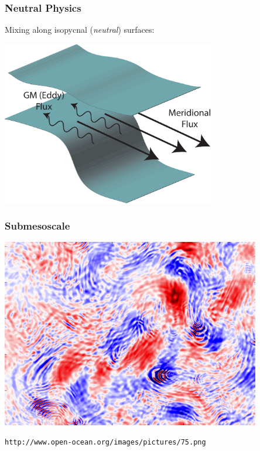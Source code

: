 \documentclass{beamer}
\begin{document}
\begin{frame}
    \frametitle{Neutral Physics}
    
    Mixing along isopycnal (\textit{neutral}) surfaces:
    \begin{center}
        \includegraphics[width=0.7\textwidth]{GMDiagram.pdf}
    \end{center}
\end{frame}

\begin{frame}
    \frametitle{Submesoscale}

    \begin{center}
        \includegraphics[width=0.85\textwidth]{submesoscale.png}
    \end{center}
    {\tiny \lstinline|http://www.open-ocean.org/images/pictures/75.png|}
\end{frame}
\end{document}

